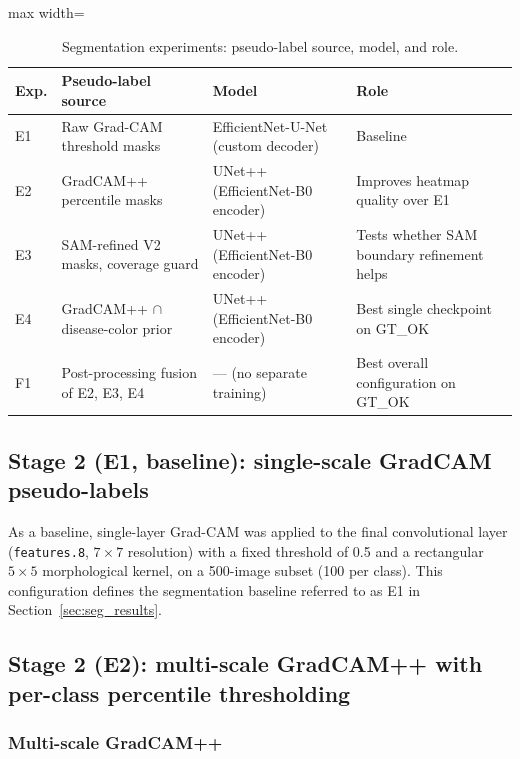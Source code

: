\documentclass[final,5p,times,twocolumn,authoryear]{elsarticle}
\begin{document}
\begin{table}[!htbp]
\centering
\caption{Segmentation experiments: pseudo-label source, model, and role.}
\label{tab:exp_overview}
\begin{adjustbox}{max width=\columnwidth}
\begin{tabular}{lllp{3.1cm}}
\toprule
\textbf{Exp.} & \textbf{Pseudo-label source} & \textbf{Model} & \textbf{Role} \\
\midrule
E1 & Raw Grad-CAM threshold masks & EfficientNet-U-Net (custom decoder) & Baseline \\
E2 & GradCAM++ percentile masks & UNet++ (EfficientNet-B0 encoder) & Improves heatmap quality over E1 \\
E3 & SAM-refined V2 masks, coverage guard & UNet++ (EfficientNet-B0 encoder) & Tests whether SAM boundary refinement helps \\
E4 & GradCAM++ $\cap$ disease-color prior & UNet++ (EfficientNet-B0 encoder) & Best single checkpoint on GT\_OK \\
\midrule
F1 & Post-processing fusion of E2, E3, E4 & --- (no separate training) & Best overall configuration on GT\_OK \\
\bottomrule
\end{tabular}
\end{adjustbox}
\end{table}

\subsection{Stage 2 (E1, baseline): single-scale GradCAM pseudo-labels}

As a baseline, single-layer Grad-CAM was applied to the final convolutional layer (\texttt{features.8}, $7\times7$ resolution) with a fixed threshold of 0.5 and a rectangular $5\times5$ morphological kernel, on a 500-image subset (100 per class). This configuration defines the segmentation baseline referred to as E1 in Section~\ref{sec:seg_results}.

\subsection{Stage 2 (E2): multi-scale GradCAM++ with per-class percentile thresholding}
\label{sec:stage2v2}

\subsubsection{Multi-scale GradCAM++}
\end{document}

